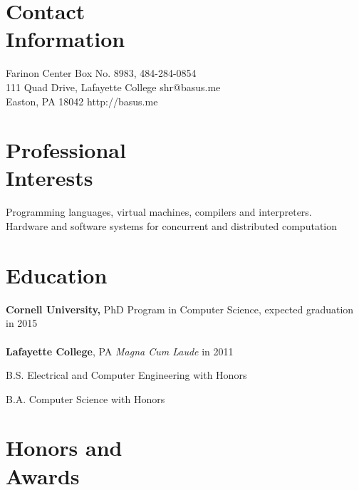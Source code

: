 \documentclass[margin,line]{resume}
\begin{document}

\begin{resume}


    \section{Contact\\Information}

    Farinon Center Box No. 8983,              \hfill 484-284-0854            \\
    111 Quad Drive, Lafayette College         \hfill shr@basus.me            \\
    Easton, PA 18042                          \hfill http://basus.me

    \section{Professional\\Interests}

    Programming languages, virtual machines, compilers and interpreters. \\
    Hardware and software systems for concurrent and distributed computation 

    \section{Education}

    {\bf Cornell University,} PhD Program in Computer Science,
    expected graduation in 2015 \\
    \\
    {\bf Lafayette College}, PA \emph{Magna Cum Laude} in 2011%
    \begin{list2}
        \item B.S. Electrical and Computer Engineering with Honors
        \item B.A. Computer Science with Honors
    \end{list2}
    \section{Honors and\\Awards}


\end{resume}
\end{document}
